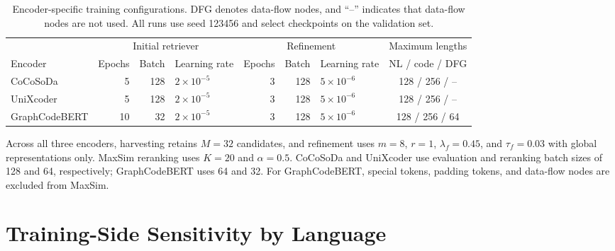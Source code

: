 \documentclass[11pt]{article}
\begin{document}
\begin{table}[!t]
  \centering
  \scriptsize
  \setlength{\tabcolsep}{5.0pt}
  \begin{tabular}{lrrlrrlc}
    \toprule
    & \multicolumn{3}{c}{Initial retriever} & \multicolumn{3}{c}{Refinement} & Maximum lengths \\
    \cmidrule(lr){2-4}\cmidrule(lr){5-7}
    Encoder & Epochs & Batch & Learning rate & Epochs & Batch & Learning rate & NL / code / DFG \\
    \midrule
    CoCoSoDa      & 5  & 128 & \(2\times10^{-5}\) & 3 & 128 & \(5\times10^{-6}\) & 128 / 256 / -- \\
    UniXcoder     & 5  & 128 & \(2\times10^{-5}\) & 3 & 128 & \(5\times10^{-6}\) & 128 / 256 / -- \\
    GraphCodeBERT & 10 & 32  & \(2\times10^{-5}\) & 3 & 128 & \(5\times10^{-6}\) & 128 / 256 / 64 \\
    \bottomrule
  \end{tabular}
  \caption{Encoder-specific training configurations. DFG denotes data-flow nodes, and ``--'' indicates that data-flow nodes are not used. All runs use seed 123456 and select checkpoints on the validation set.}
  \label{tab:encoder_training_config}
\end{table}

Across all three encoders, harvesting retains \(M=32\) candidates, and refinement uses \(m=8\), \(r=1\), \(\lambda_f=0.45\), and \(\tau_f=0.03\) with global representations only. MaxSim reranking uses \(K=20\) and \(\alpha=0.5\). CoCoSoDa and UniXcoder use evaluation and reranking batch sizes of 128 and 64, respectively; GraphCodeBERT uses 64 and 32. For GraphCodeBERT, special tokens, padding tokens, and data-flow nodes are excluded from MaxSim.

\section{Training-Side Sensitivity by Language}
\label{app:parameter_sensitivity}
\end{document}
